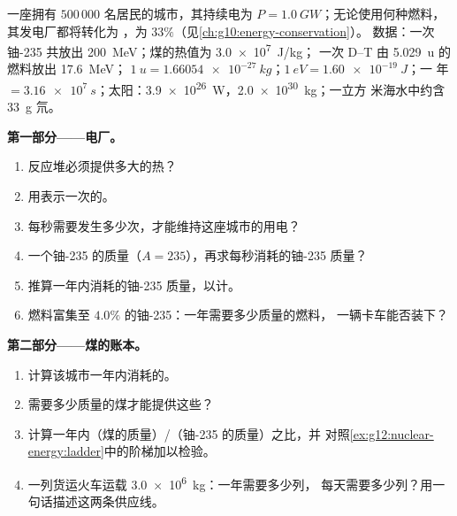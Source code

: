 \begin{problem}
\label{pb:g12:nuclear-energy:1}
一座拥有 $500\,000$ 名居民的城市，其持续电为
$P = \qty{1.0}{GW}$；无论使用何种燃料，其发电厂都将转化为
，为 $33\%$（见\cref{ch:g10:energy-conservation}）。
数据：一次铀-235 共放出 \qty{200}{MeV}；煤的热值为 \qty{3.0e7}{J/kg}；
一次 D--T 由 \qty{5.029}{u} 的燃料放出 \qty{17.6}{MeV}；
$\qty{1}{u} = \qty{1.66054e-27}{kg}$；$\qty{1}{eV} = \qty{1.60e-19}{J}$；一
年 $= \qty{3.16e7}{s}$；太阳：\qty{3.9e26}{W}，\qty{2.0e30}{kg}；一立方
米海水中约含 \qty{33}{g} 氘。

\medskip
\noindent\textbf{第一部分——电厂。}
\begin{enumerate}
  \item 反应堆必须提供多大的热？
  \item 用表示一次的。
  \item 每秒需要发生多少次，才能维持这座城市的用电？
  \item 一个铀-235 的质量（$A = 235$），再求每秒消耗的铀-235
        质量？
  \item 推算一年内消耗的铀-235 质量，以计。
  \item 燃料富集至 $4.0\%$ 的铀-235：一年需要多少质量的燃料，
        一辆卡车能否装下？
\end{enumerate}

\medskip
\noindent\textbf{第二部分——煤的账本。}
\begin{enumerate}[resume]
  \item 计算该城市一年内消耗的。
  \item 需要多少质量的煤才能提供这些？
  \item 计算一年内（煤的质量）/（铀-235 的质量）之比，并
        对照\cref{ex:g12:nuclear-energy:ladder}中的阶梯加以检验。
  \item 一列货运火车运载 \qty{3.0e6}{kg}：一年需要多少列，
        每天需要多少列？用一句话描述这两条供应线。
\end{enumerate}


\end{problem}
